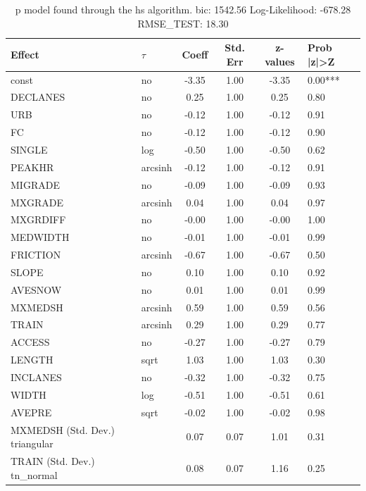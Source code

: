 \begin{table}
	\caption{p model found through the hs algorithm. bic: 1542.56 Log-Likelihood: -678.28 RMSE_TEST: 18.30}
	\begin{center}
		\begin{tabular}{|l|l|c|c|c|l|}
			\hline
			Effect & $\tau$ & Coeff & Std. Err & z-values & Prob |z|>Z \\
			\hline
			const & no & -3.35 & 1.00 & -3.35 & 0.00*** \\
			\hline
			DECLANES & no & 0.25 & 1.00 & 0.25 & 0.80 \\
			\hline
			URB & no & -0.12 & 1.00 & -0.12 & 0.91 \\
			\hline
			FC & no & -0.12 & 1.00 & -0.12 & 0.90 \\
			\hline
			SINGLE & log & -0.50 & 1.00 & -0.50 & 0.62 \\
			\hline
			PEAKHR & arcsinh & -0.12 & 1.00 & -0.12 & 0.91 \\
			\hline
			MIGRADE & no & -0.09 & 1.00 & -0.09 & 0.93 \\
			\hline
			MXGRADE & arcsinh & 0.04 & 1.00 & 0.04 & 0.97 \\
			\hline
			MXGRDIFF & no & -0.00 & 1.00 & -0.00 & 1.00 \\
			\hline
			MEDWIDTH & no & -0.01 & 1.00 & -0.01 & 0.99 \\
			\hline
			FRICTION & arcsinh & -0.67 & 1.00 & -0.67 & 0.50 \\
			\hline
			SLOPE & no & 0.10 & 1.00 & 0.10 & 0.92 \\
			\hline
			AVESNOW & no & 0.01 & 1.00 & 0.01 & 0.99 \\
			\hline
			MXMEDSH & arcsinh & 0.59 & 1.00 & 0.59 & 0.56 \\
			\hline
			TRAIN & arcsinh & 0.29 & 1.00 & 0.29 & 0.77 \\
			\hline
			ACCESS & no & -0.27 & 1.00 & -0.27 & 0.79 \\
			\hline
			LENGTH & sqrt & 1.03 & 1.00 & 1.03 & 0.30 \\
			\hline
			INCLANES & no & -0.32 & 1.00 & -0.32 & 0.75 \\
			\hline
			WIDTH & log & -0.51 & 1.00 & -0.51 & 0.61 \\
			\hline
			AVEPRE & sqrt & -0.02 & 1.00 & -0.02 & 0.98 \\
			\hline
			MXMEDSH (Std. Dev.) triangular &  & 0.07 & 0.07 & 1.01 & 0.31 \\
			\hline
			TRAIN (Std. Dev.) tn_normal &  & 0.08 & 0.07 & 1.16 & 0.25 \\

\end{tabular}
\end{center}
\end{table}
